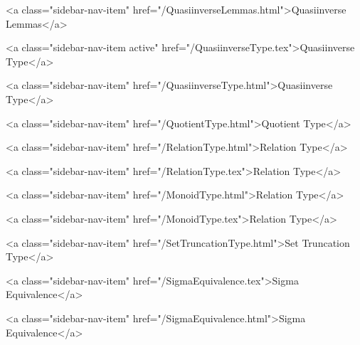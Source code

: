      
    
      
        
          <a class="sidebar-nav-item" href="/QuasiinverseLemmas.html">Quasiinverse Lemmas</a>
        
      
    
      
        
          <a class="sidebar-nav-item active" href="/QuasiinverseType.tex">Quasiinverse Type</a>
        
      
    
      
        
          <a class="sidebar-nav-item" href="/QuasiinverseType.html">Quasiinverse Type</a>
        
      
    
      
        
          <a class="sidebar-nav-item" href="/QuotientType.html">Quotient Type</a>
        
      
    
      
        
          <a class="sidebar-nav-item" href="/RelationType.html">Relation Type</a>
        
      
    
      
        
          <a class="sidebar-nav-item" href="/RelationType.tex">Relation Type</a>
        
      
    
      
        
          <a class="sidebar-nav-item" href="/MonoidType.html">Relation Type</a>
        
      
    
      
        
          <a class="sidebar-nav-item" href="/MonoidType.tex">Relation Type</a>
        
      
    
      
        
          <a class="sidebar-nav-item" href="/SetTruncationType.html">Set Truncation Type</a>
        
      
    
      
        
          <a class="sidebar-nav-item" href="/SigmaEquivalence.tex">Sigma Equivalence</a>
        
      
    
      
        
          <a class="sidebar-nav-item" href="/SigmaEquivalence.html">Sigma Equivalence</a>
        
